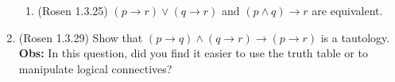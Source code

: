 \begin{enumerate}
\begin{enumerate}
\item \streasy (Rosen 1.3.25) $(p \rightarrow r) \vee (q \rightarrow r)$ and 
$(p \wedge q) \rightarrow r$ are equivalent.


\end{enumerate}

\item \strhard (Rosen 1.3.29) Show that $(p \rightarrow q) \wedge (q \rightarrow r) \rightarrow (p \rightarrow r)$ 
is a tautology. \\
\textbf{Obs:} In this question, did you find it easier to use the truth table or to manipulate logical connectives?

\solution{

}
\end{enumerate}
